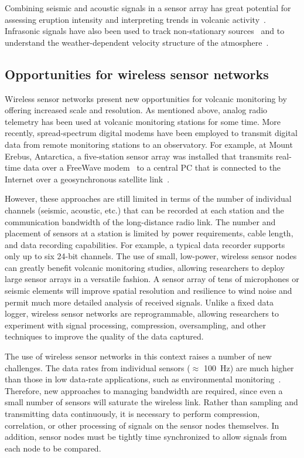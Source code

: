 Combining seismic and acoustic signals in a sensor array has great
potential for assessing eruption intensity and interpreting trends
in volcanic activity~\cite{Johnson04}.  Infrasonic signals have
also been used to track non-stationary sources~\cite{Yamasato97}
and to understand the weather-dependent velocity structure of the
atmosphere~\cite{Garces98}.

\subsection{Opportunities for wireless sensor networks}

Wireless sensor networks present new opportunities for volcanic
monitoring by offering increased scale and resolution.  As mentioned above,
analog radio telemetry has been used at volcanic monitoring stations
for some time. More recently, spread-spectrum digital modems have been
employed to transmit digital data from remote monitoring stations to an
observatory. For example, at Mount Erebus, Antarctica, a five-station
sensor array was installed that transmits real-time data over a FreeWave
modem~\cite{freewave} to a central PC that is connected to the Internet
over a geosynchronous satellite link~\cite{Aster04}.

However, these approaches are still limited in terms of the number of
individual channels (seismic, acoustic, etc.) that can be recorded at
each station and the communication bandwidth of the long-distance 
radio link. The number and placement of sensors at a station is limited by 
power requirements, cable length, and data recording capabilities.
For example, a typical data recorder supports only up to six 24-bit 
channels. The use of small, low-power, wireless sensor nodes can 
greatly benefit volcanic monitoring
studies, allowing researchers to deploy large sensor arrays in a
versatile fashion. A sensor array of tens of microphones or seismic
elements will improve spatial resolution and resilience to wind noise and
permit much more detailed analysis of received signals. Unlike a fixed data
logger, wireless sensor networks are 
reprogrammable, allowing researchers to experiment with signal processing,
compression, oversampling, and other techniques to improve the quality
of the data captured.

The use of wireless sensor networks in this context raises a number of
new challenges. The data rates from individual sensors ($\approx$ 100~Hz) 
are much higher than those in low data-rate applications, such as
environmental monitoring~\cite{mainwaring-habitat,gdi-ewsn04}. Therefore, new
approaches to managing bandwidth are required, since even a small 
number of sensors will saturate the wireless link. Rather than
sampling and transmitting data continuously, it is necessary to 
perform compression, correlation, or other processing of signals on
the sensor nodes themselves. In addition, sensor nodes must be tightly 
time synchronized to allow signals from each node to be compared. 


